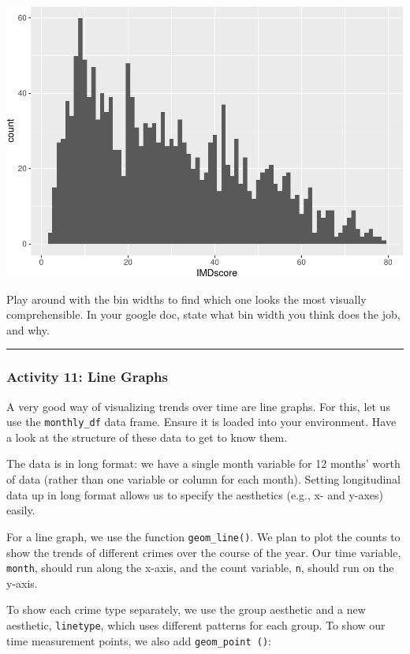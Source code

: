 \documentclass[
]{book}
\begin{document}
\includegraphics{03-data-visualisation_files/figure-latex/unnamed-chunk-19-1.pdf}

Play around with the bin widths to find which one looks the most visually comprehensible. In your google doc, state what bin width you think does the job, and why.

\begin{center}\rule{0.5\linewidth}{0.5pt}\end{center}

\hypertarget{activity-11-line-graphs}{%
\subsubsection{Activity 11: Line Graphs}\label{activity-11-line-graphs}}

A very good way of visualizing trends over time are line graphs. For this, let us use the \texttt{monthly\_df} data frame. Ensure it is loaded into your environment. Have a look at the structure of these data to get to know them.

The data is in long format: we have a single month variable for 12 months' worth of data (rather than one variable or column for each month). Setting longitudinal data up in long format allows us to specify the aesthetics (e.g., x- and y-axes) easily.

For a line graph, we use the function \texttt{geom\_line()}. We plan to plot the counts to show the trends of different crimes over the course of the year. Our time variable, \texttt{month}, should run along the x-axis, and the count variable, \texttt{n}, should run on the y-axis.

To show each crime type separately, we use the group aesthetic and a new aesthetic, \texttt{linetype}, which uses different patterns for each group. To show our time measurement points, we also add \texttt{geom\_point\ ()}:
\end{document}
